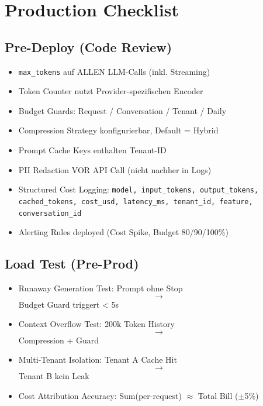 \section{Production Checklist}
\label{sec:production_checklist}

\subsection{Pre-Deploy (Code Review)}
\label{sec:pre_deploy}

\begin{itemize}[leftmargin=*]
  \item [ ] \texttt{max\_tokens} auf ALLEN LLM-Calls (inkl. Streaming)
  \item [ ] Token Counter nutzt Provider-spezifischen Encoder
  \item [ ] Budget Guards: Request / Conversation / Tenant / Daily
  \item [ ] Compression Strategy konfigurierbar, Default = Hybrid
  \item [ ] Prompt Cache Keys enthalten Tenant-ID
  \item [ ] PII Redaction VOR API Call (nicht nachher in Logs)
  \item [ ] Structured Cost Logging: \texttt{model, input\_tokens, output\_tokens, cached\_tokens, cost\_usd, latency\_ms, tenant\_id, feature, conversation\_id}
  \item [ ] Alerting Rules deployed (Cost Spike, Budget 80/90/100\%)
\end{itemize}

\subsection{Load Test (Pre-Prod)}
\label{sec:load_test}

\begin{itemize}[leftmargin=*]
  \item [ ] Runaway Generation Test: Prompt ohne Stop $$\to$$ Budget Guard triggert < 5s
  \item [ ] Context Overflow Test: 200k Token History $$\to$$ Compression + Guard
  \item [ ] Multi-Tenant Isolation: Tenant A Cache Hit $$\to$$ Tenant B kein Leak
  \item [ ] Cost Attribution Accuracy: Sum(per-request) $\approx$ Total Bill ($\pm$5\%)
\end{itemize}

